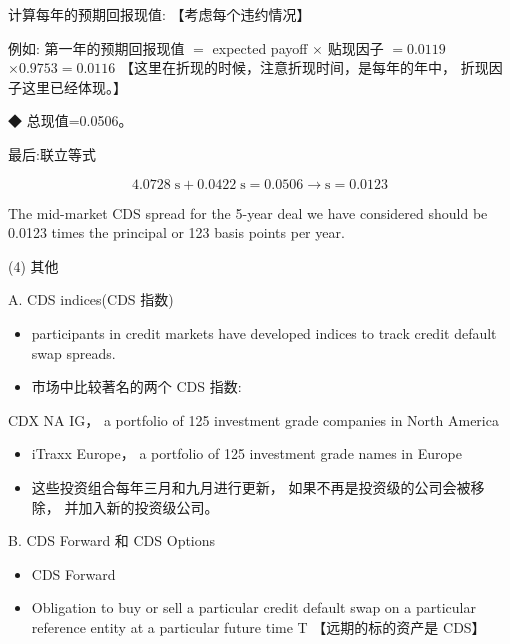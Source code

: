  计算每年的预期回报现值: 【考虑每个违约情况】

例如: 第一年的预期回报现值 \(=\) expected payoff \(\times\) 贴现因子 \(= {0.0119}\)  \(\times  {0.9753} = {0.0116}\) 【这里在折现的时候，注意折现时间，是每年的年中， 折现因子这里已经体现。】

◆ 总现值=0.0506。

 最后:联立等式

\[
{4.0728}\mathrm{\;s} + {0.0422}\mathrm{\;s} = {0.0506} \rightarrow  \mathrm{s} = {0.0123}
\]

The mid-market CDS spread for the 5-year deal we have considered should be 0.0123 times the principal or 123 basis points per year.

(4) 其他

A. CDS indices(CDS 指数)

\begin{itemize}
\item participants in credit markets have developed indices to track credit default swap spreads.
\end{itemize}

\begin{itemize}
\item 市场中比较著名的两个 CDS 指数:
\end{itemize}

 CDX NA IG， a portfolio of 125 investment grade companies in North America

\begin{itemize}
\item iTraxx Europe， a portfolio of 125 investment grade names in Europe
\end{itemize}

\begin{itemize}
\item 这些投资组合每年三月和九月进行更新， 如果不再是投资级的公司会被移除， 并加入新的投资级公司。
\end{itemize}

B. CDS Forward 和 CDS Options

\begin{itemize}
\item CDS Forward
\end{itemize}

\begin{itemize}
\item Obligation to buy or sell a particular credit default swap on a particular reference entity at a particular future time T 【远期的标的资产是 CDS】
\end{itemize}

